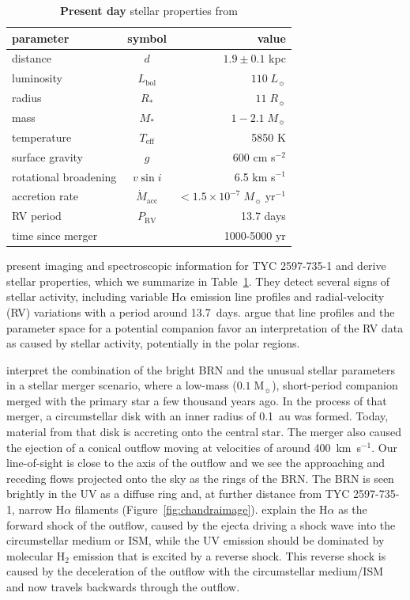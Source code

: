 \documentclass[linenumbers]{aastex631}
\begin{document}
\begin{table}
\caption{\textbf{Present day} stellar properties from \citet{2020Natur.587..387H} \label{tab:parameters}}
\begin{tabular}{lcr}
\hline \hline
parameter & symbol & value \\
\hline
distance & $d$ & $1.9 \pm 0.1$ kpc\\
luminosity & $L_\mathrm{bol}$ & $110 \;L_\sun{}$\\
radius & $R_*$ & $11\;R_\sun{}$\\
mass & $M_*$ & $1-2.1\;M_\sun{}$\\
temperature & $T_\mathrm{eff}$ & 5850 K\\
surface gravity & $g$ & 600 cm s$^{-2}$\\
rotational broadening & $v \sin i$ & 6.5 km s$^{-1}$\\
accretion rate & $\dot M_\mathrm{acc}$ & $<1.5 \times 10^{-7}\; M_\sun{}\;\mathrm{yr}^{-1}$\\
RV period & $P_\mathrm{RV}$ & 13.7 days \\
time since merger & & 1000-5000 yr\\
\hline
\end{tabular}
\end{table}

\cite{2020Natur.587..387H} present imaging and spectroscopic information for TYC 2597-735-1 and derive stellar properties, which we summarize in Table~\ref{tab:parameters}. They detect several signs of stellar activity, including variable H$\alpha$ emission line profiles and radial-velocity (RV)  variations with a period around 13.7~days. \cite{2020Natur.587..387H} argue that line profiles and the parameter space for a potential companion favor an interpretation of the RV data as caused by stellar activity, potentially in the polar regions.

\cite{2020Natur.587..387H} interpret the combination of the bright BRN and the unusual stellar parameters in a stellar merger scenario, where a low-mass ($0.1\;\mathrm{M}_\sun$), short-period companion merged with the primary star a few thousand years ago. In the process of that merger, a circumstellar disk with an inner radius of 0.1~au was formed. Today, material from that disk is accreting onto the central star. The merger also caused the ejection of a conical outflow moving at velocities of around 400~km~s$^{-1}$. Our line-of-sight is close to the axis of the outflow and we see the approaching and receding flows projected onto the sky as the rings of the BRN.
The BRN is seen brightly in the UV as a diffuse ring and, at further distance from TYC 2597-735-1, narrow H$\alpha$ filaments (Figure~\ref{fig:chandraimage}). \cite{2020Natur.587..387H} explain the H$\alpha$ as the forward shock of the outflow, caused by the ejecta driving a shock wave into the circumstellar medium or ISM, while the UV emission should be dominated by molecular H$_2$ emission that is excited by a reverse shock. This reverse shock is caused by the deceleration of the outflow with the circumstellar medium/ISM and now travels backwards through the outflow.
\end{document}
